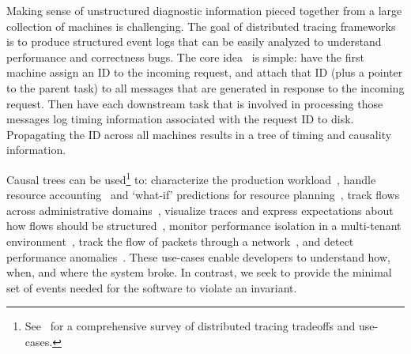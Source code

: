  Making sense of unstructured diagnostic
information pieced together from a large collection of machines is
challenging. The goal of distributed tracing frameworks is to
produce structured event logs that can be easily analyzed to understand performance and
correctness bugs. The core idea~\cite{path} is simple: have the first machine assign an ID to the incoming request,
and attach that ID (plus a pointer to the parent task) to all messages that are generated in response to the
incoming request. Then have each downstream task that is involved in processing those
messages log timing information associated with the request ID to disk.
Propagating the ID across all machines results in a tree of
timing and causality information.

Causal trees can be used\footnote{See~\cite{tracing_overview} for a
comprehensive survey of distributed tracing tradeoffs and use-cases.} to: characterize the
production workload~\cite{barham2004using}, handle
resource accounting~\cite{stardust} and `what-if' predictions for resource
planning~\cite{ironmodel},
track flows across administrative domains~\cite{fonseca2007x}, visualize traces and express expectations about how flows should
be structured~\cite{pip}, monitor performance isolation in a multi-tenant
environment~\cite{retro}, track the flow of packets through a
network~\cite{ndb}, and detect performance anomalies~\cite{perf_changes}.
These use-cases enable developers to understand
how, when, and where the system broke. In contrast, we seek to provide the
minimal set of events needed for the software
to violate an invariant.


